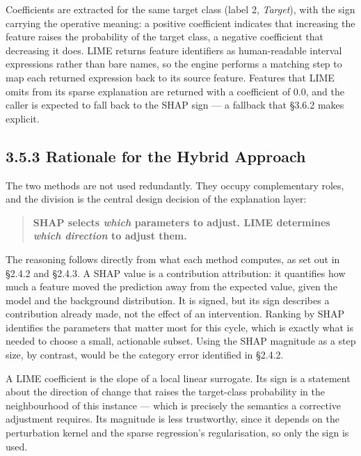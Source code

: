 Coefficients are extracted for the same target class (label 2, \emph{Target}), with the sign carrying the operative meaning: a positive coefficient indicates that increasing the feature raises the probability of the target class, a negative coefficient that decreasing it does. LIME returns feature identifiers as human-readable interval expressions rather than bare names, so the engine performs a matching step to map each returned expression back to its source feature. Features that LIME omits from its sparse explanation are returned with a coefficient of 0.0, and the caller is expected to fall back to the SHAP sign --- a fallback that §3.6.2 makes explicit.

\hypertarget{rationale-for-the-hybrid-approach}{%
\subsection{3.5.3 Rationale for the Hybrid Approach}\label{rationale-for-the-hybrid-approach}}

The two methods are not used redundantly. They occupy complementary roles, and the division is the central design decision of the explanation layer:

\begin{quote}
\textbf{SHAP selects \emph{which} parameters to adjust. LIME determines \emph{which direction} to adjust them.}
\end{quote}

The reasoning follows directly from what each method computes, as set out in §2.4.2 and §2.4.3. A SHAP value is a contribution attribution: it quantifies how much a feature moved the prediction away from the expected value, given the model and the background distribution. It is signed, but its sign describes a contribution already made, not the effect of an intervention. Ranking by \textbar SHAP\textbar{} identifies the parameters that matter most for this cycle, which is exactly what is needed to choose a small, actionable subset. Using the SHAP magnitude as a step size, by contrast, would be the category error identified in §2.4.2.

A LIME coefficient is the slope of a local linear surrogate. Its sign is a statement about the direction of change that raises the target-class probability in the neighbourhood of this instance --- which is precisely the semantics a corrective adjustment requires. Its magnitude is less trustworthy, since it depends on the perturbation kernel and the sparse regression's regularisation, so only the sign is used.

